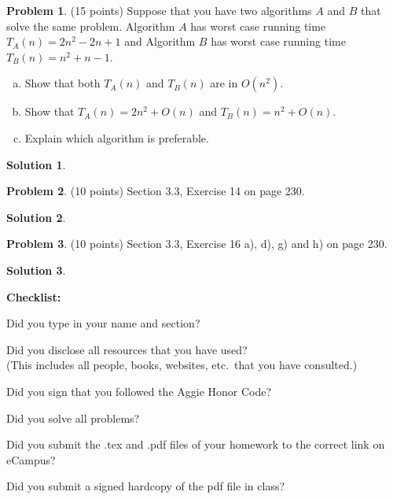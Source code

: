\documentclass{article}
\theoremstyle{definition}
\newtheorem{problem}{Problem}
\newtheorem*{solution}{Solution}
\newcommand{\checklist}{\noindent\textbf{Checklist:}
\begin{compactitem}[$\Box$] 
\item Did you type in your name and section? 
\item Did you disclose all resources that you have used? \\
(This includes all people, books, websites, etc.\ that you have consulted.)
\item Did you sign that you followed the Aggie Honor Code? 
\item Did you solve all problems? 
\item Did you submit the .tex and .pdf files of your homework to the correct link on eCampus?
\item Did you submit a signed hardcopy of the pdf file in class? 
\end{compactitem}
}
\begin{document}
\begin{problem} (15 points)
Suppose that you have two algorithms $A$ and $B$ that solve the same
problem. Algorithm $A$ has worst case running time $T_A(n) = 2n^2-2n+1$ 
and Algorithm $B$ has worst case running time $T_B(n) = n^2+n-1$. 
\begin{enumerate}[a)]
\item Show that both $T_A(n)$ and $T_B(n)$ are in $O(n^2)$. 
\item Show that $T_A(n) = 2n^2 + O(n)$ and $T_B(n) = n^2 +O(n)$. 
\item Explain which algorithm is preferable. 
\end{enumerate}
\end{problem}
\begin{solution}
\end{solution}

\begin{problem} (10 points) Section 3.3, Exercise 14 on page 230.
\end{problem}
\begin{solution}
\end{solution}

\begin{problem} (10 points) Section 3.3, Exercise 16 a), d), g) and h) on page 230.
\end{problem}
\begin{solution}
\end{solution}

\goodbreak
\checklist
\end{document}
